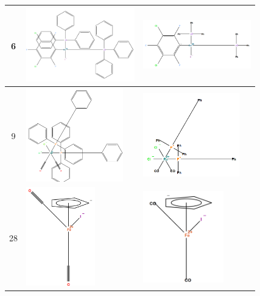 \begin{longtable}{c>{\centering}m{5cm}>{\centering\arraybackslash}m{5.9cm}}
        6 &
        \includegraphics[width=4.7cm]{imagenes/resultados/moleculas/mol6.png} & \includegraphics[width=4.7cm]{imagenes/resultados/moleculas/mol6_ALIAS.png} \\
        \midrule
        9 &
       \includegraphics[width=4.2cm]{imagenes/resultados/moleculas/mol9.png} & \includegraphics[width=4.2cm]{imagenes/resultados/moleculas/mol9_alias.png} \\ 
        \midrule
        28 &
        \includegraphics[width=3cm]{imagenes/resultados/moleculas/iron(II).png} & \includegraphics[width=3.5cm]{imagenes/resultados/moleculas/iron(II)_alias.png} 

\end{longtable}
